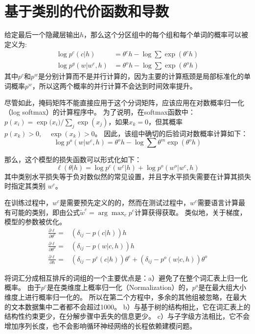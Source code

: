 \section{基于类别的代价函数和导数}
给定最后一个隐藏层输出$ h $，那么这个分区组中的每个组和每个单词的概率可以被定义为:
\begin{equation}
\begin{split}
\log p^c(c|h) &= \theta^c h-\log \sum{\exp( \theta^c h )} \\
\log p^g(w|w^c,h)&=\theta^o h -\log\sum\exp{(\theta^o h)}
\end{split}
\end{equation}
其中$ p ^ c $和$ p ^ w $是分别计算而不是并行计算的，因为主要的计算瓶颈是局部标准化的单词概率$ p ^ w $，所以这两个概率的并行计算不会达到时间效率提升。


尽管如此，掩码矩阵不能直接应用于这个分词矩阵，应该应用在对数概率归一化（log softmax）的计算程序中。 为了说明，在softmax函数中：$ p(x_i)= {\exp({x_i}})/ {\sum_j \exp(x_j)} $，如果$ x_k = 0 $，但其概率$ p(x_k)> 0,\quad \exp(x_k)> 0 $。 因此，该组中确切的后验词对数概率计算如下：
\begin{equation}
  \log p^o(w|w^c,h)=\theta^o h -\log\sum\theta^m\exp(\theta^o h)
\end{equation}

那么，这个模型的损失函数可以形式化如下：
\begin{equation}
\ell(\theta|h) =\log p^c(w^c|h) +\log p^o(w^o|w^c,h)
\end{equation}
其中类别水平损失等于负对数似然的常见设置，并且字水平损失需要在计算其损失时指定其类别 $ w ^ c $。

在训练过程中，$ w ^ c $是需要预先定义的的，然而在测试过程中，$w^c$需要语言计算最有可能的类别，即由公式$\tilde w^c=\arg\max_c p^c$计算获得获取。 类似地，关于梯度，模型的参数被优化。
\begin{equation}
\begin{split}
\frac{\partial \ell}{\partial \theta^c}=& (\delta_{ij}-p(c|h))h \\
\frac{\partial \ell}{\partial \theta^o}=&(\delta_{ij}-p(w|c,h))h \\
\frac{\partial \ell}{\partial h}=&(\delta_{ij}-p^c(c|h))\theta^c + (\delta_{ij}-p^o(w|c,h))\theta^o
\end{split}
\end{equation}

将词汇分成相互排斥的词组的一个主要优点是：a）避免了在整个词汇表上归一化概率。 由于$ p ^ c $是在类维度上概率归一化（Normalization）的，$ p ^ o $是在最大组大小维度上进行概率归一化的。 所以在第二个方程中，多余的其他组被忽略，在最大的文本数据集中二者都不会超过1000。 b）与基于树的结构相比，它在词汇表上的结构性约束更少，在分解步骤中丢失的信息更少。 c）与子字级方法相比，它不会增加序列长度，也不会影响循环神经网络的长程依赖建模问题。



